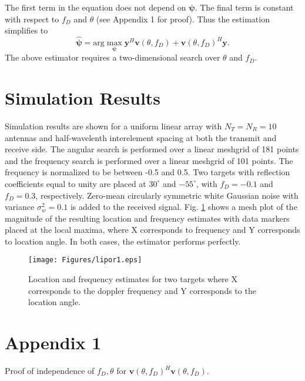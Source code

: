 \documentclass[journal,draftcls,onecolumn,twoside]{IEEEtran}
\begin{document}
The first term in the equation does not depend on $\mathbf{\psi}$. The final term is constant with respect to $f_{D}$ and $\theta$ (see Appendix 1 for proof). Thus the estimation simplifies to
\begin{equation}
\hat{\mathbf{\psi}} = \mathrm{arg} \; \underset{\mathbf{\psi}}{\mathrm{max}} \; \mathbf{y}^{H}\mathbf{v}(\theta,f_{D}) + \mathbf{v}(\theta,f_{D})^{H}\mathbf{y}.
\end{equation}
The above estimator requires a two-dimensional search over $\theta$ and $f_{D}$.

\section{Simulation Results}
\label{sec:Simulation Results}

Simulation results are shown for a uniform linear array with $N_{T} = N_{R} = 10$ antennas and half-wavelenth interelement spacing at both the transmit and receive side. The angular search is performed over a linear meshgrid of 181 points and the frequency search is performed over a linear meshgrid of 101 points. The frequency is normalized to be between -0.5 and 0.5. Two targets with reflection coefficients equal to unity are placed at $30^{\circ}$ and $-55^{\circ}$, with $f_{D} = -0.1$ and $f_{D} = 0.3$, respectively. Zero-mean circularly symmetric white Gaussian noise with variance $\sigma_{w}^{2} = 0.1$ is added to the received signal. Fig. \ref{fig:1} shows a mesh plot of the magnitude of the resulting location and frequency estimates with data markers placed at the local maxima, where X corresponds to frequency and Y corresponds to location angle. In both cases, the estimator performs perfectly.

\begin{figure}[ht!]
\centering
\texttt{[image: Figures/lipor1.eps]}
\caption{Location and frequency estimates for two targets where X corresponds to the doppler frequency and Y corresponds to the location angle.}
\label{fig:1}
\end{figure}

\section{Appendix 1}
\label{sec:Appendix 1}

Proof of independence of $f_{D},\theta$ for $\mathbf{v}(\theta,f_{D})^{H}\mathbf{v}(\theta,f_{D})$.
\end{document}
